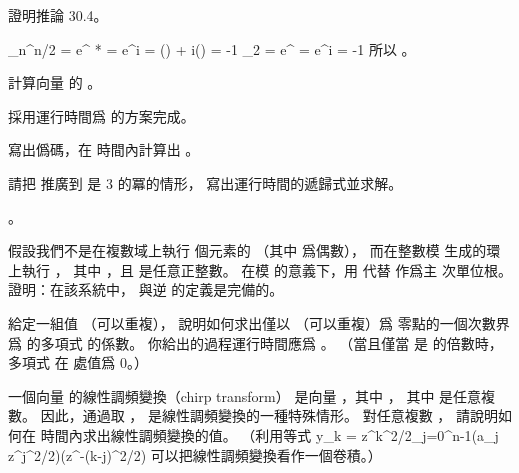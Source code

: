 \startsection[
  title={The DFT and FFT},
  reference=section:dft_fft,
]

\startEXERCISE
證明推論 30.4。
\stopEXERCISE

\startANSWER
\startformula\startmathalignment
\NC \omega_n^{n/2} \NC = e^{ * }
    = e^{\pi i} = \cos(\pi) + i\sin(\pi) = -1 \NR
\NC \omega_2 \NC = e^{} = e^{\pi i} = -1 \NR
\stopmathalignment\stopformula
所以 。
\stopANSWER

\startEXERCISE
計算向量  的 。
\stopEXERCISE

\startANSWER
{}
\stopANSWER

\startEXERCISE
採用運行時間爲  的方案完成。
\stopEXERCISE

\startANSWER
{}
\stopANSWER

\startEXERCISE
寫出僞碼，在  時間內計算出 。
\stopEXERCISE

\startANSWER
{}
\stopANSWER

\startEXERCISE
請把  推廣到  是 3 的冪的情形，
寫出運行時間的遞歸式並求解。
\stopEXERCISE

\startANSWER
{}。
\stopANSWER

\startEXERCISE[exercise:30.2-6]\DIFFICULT
假設我們不是在複數域上執行  個元素的  （其中  爲偶數），
而在整數模  生成的環  上執行 ，
其中 ，且  是任意正整數。
在模  的意義下，用  代替  作爲主  次單位根。
證明：在該系統中，  與逆  的定義是完備的。
\stopEXERCISE

\startANSWER
{}
\stopANSWER

\startEXERCISE
給定一組值  （可以重複），
說明如何求出僅以  （可以重複）爲
零點的一個次數界爲  的多項式  的係數。
你給出的過程運行時間應爲 。
（\hint 當且僅當  是  的倍數時，
多項式  在  處值爲 0。）
\stopEXERCISE

\startANSWER
{}
\stopANSWER

\startEXERCISE\DIFFICULT
一個向量  的{\EMP 線性調頻變換}（chirp transform）
是向量 ，其中 ，
其中  是任意複數。
因此，通過取 ，  是線性調頻變換的一種特殊情形。
對任意複數 ，
請說明如何在  時間內求出線性調頻變換的值。
（\hint 利用等式
\startformula
y_k = z^{k^2/2}\sum_{j=0}^{n-1}(a_j z^{j^2/2})(z^{-(k-j)^2/2})
\stopformula
可以把線性調頻變換看作一個卷積。）
\stopEXERCISE

